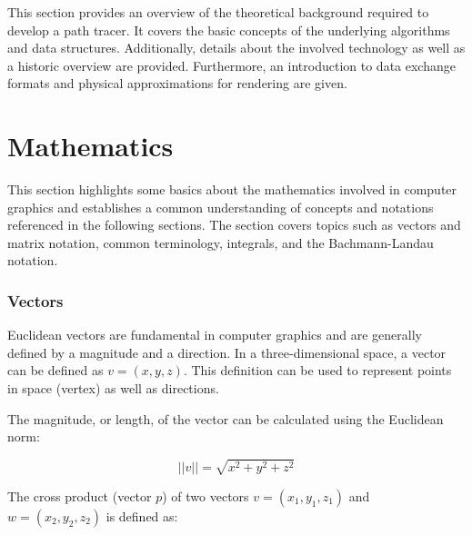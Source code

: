 \label{ch:theory}

This section provides an overview of the theoretical background required to develop a path tracer. It covers the basic concepts of the underlying algorithms and data structures. Additionally, details about the involved technology as well as a historic overview are provided. Furthermore, an introduction to data exchange formats and physical approximations for rendering are given.

\section{Mathematics}

This section highlights some basics about the mathematics involved in computer graphics and establishes a common understanding of concepts and notations referenced in the following sections. The section covers topics such as vectors and matrix notation, common terminology, integrals, and the Bachmann-Landau notation.

\subsubsection{Vectors}

Euclidean vectors are fundamental in computer graphics and are generally defined by a magnitude and a direction. In a three-dimensional space, a vector can be defined as $v = (x, y, z)$. This definition can be used to represent points in space (vertex) as well as directions.

The magnitude, or length, of the vector can be calculated using the Euclidean norm:

\begin{equation}
  \label{eqn:euclidean-norm}
  ||v|| = \sqrt{x^2 + y^2 + z^2}
\end{equation}



The cross product (vector $p$) of two vectors $v = (x_1, y_1, z_1)$ and $w = (x_2, y_2, z_2)$ is defined as:

